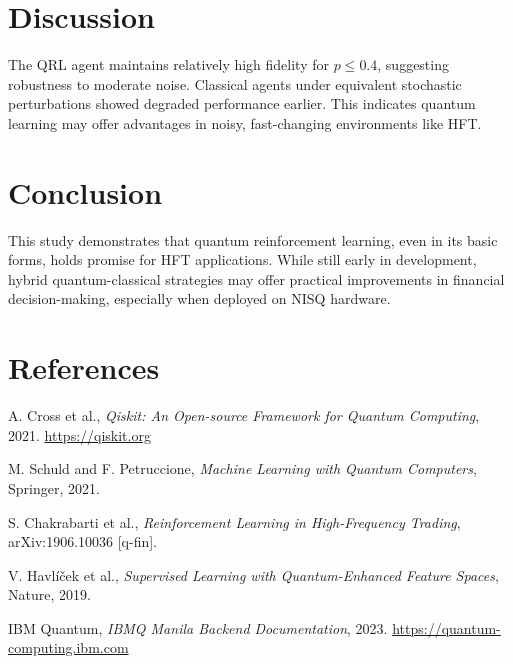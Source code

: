 \documentclass[a4paper,12pt]{article}
\begin{document}
\section{Discussion}
The QRL agent maintains relatively high fidelity for \( p \leq 0.4 \), suggesting robustness to moderate noise. Classical agents under equivalent stochastic perturbations showed degraded performance earlier. This indicates quantum learning may offer advantages in noisy, fast-changing environments like HFT.

\section{Conclusion}
This study demonstrates that quantum reinforcement learning, even in its basic forms, holds promise for HFT applications. While still early in development, hybrid quantum-classical strategies may offer practical improvements in financial decision-making, especially when deployed on NISQ hardware.

\section{References}
\begin{thebibliography}{9}
A. Cross et al., \textit{Qiskit: An Open-source Framework for Quantum Computing}, 2021. \url{https://qiskit.org}

M. Schuld and F. Petruccione, \textit{Machine Learning with Quantum Computers}, Springer, 2021.

S. Chakrabarti et al., \textit{Reinforcement Learning in High-Frequency Trading}, arXiv:1906.10036 [q-fin].

V. Havlíček et al., \textit{Supervised Learning with Quantum-Enhanced Feature Spaces}, Nature, 2019.

IBM Quantum, \textit{IBMQ Manila Backend Documentation}, 2023. \url{https://quantum-computing.ibm.com}
\end{thebibliography}
\end{document}
